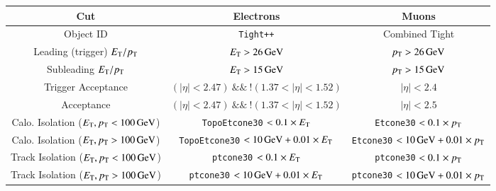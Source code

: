 \begin{table}[h]
	\centering
	\scriptsize
	\begin{tabular}{ccc}
		Cut & Electrons & Muons \\
		\hline
		Object ID & \texttt{Tight++} & Combined Tight \\
		Leading (trigger) $E_{\text{T}}/p_{\text{T}}$ & $E_{\text{T}}>\SI{26}{\giga\electronvolt} $ & $p_{\text{T}}>\SI{26}{\giga\electronvolt} $ \\
		Subleading $E_{\text{T}}/p_{\text{T}}$ & $E_{\text{T}}>\SI{15}{\giga\electronvolt} $ & $p_{\text{T}}>\SI{15}{\giga\electronvolt} $ \\
		Trigger Acceptance & $(|\eta|<2.47)\ \&\&\ !(1.37<|\eta|<1.52)$ & $|\eta|<2.4$ \\
		Acceptance & $(|\eta|<2.47)\ \&\&\ !(1.37<|\eta|<1.52)$ & $|\eta|<2.5$ \\
		Calo. Isolation ($E_{\text{T}},p_{\text{T}}<\SI{100}{\giga\electronvolt}$) & \verb.TopoEtcone30. $<0.1\times E_{\text{T}}$  & \verb.Etcone30. $<0.1\times p_{\text{T}}$ \\
		Calo. Isolation ($E_{\text{T}},p_{\text{T}}>\SI{100}{\giga\electronvolt}$) & \verb.TopoEtcone30. $<\SI{10}{\giga\electronvolt} +0.01\times E_{\text{T}}$ & \verb.Etcone30. $<\SI{10}{\giga\electronvolt} +0.01\times p_{\text{T}} $ \\
		Track Isolation ($E_{\text{T}},p_{\text{T}}<\SI{100}{\giga\electronvolt}$) & \verb.ptcone30. $< 0.1\times E_{\text{T}} $ & \verb.ptcone30. $<0.1\times p_{\text{T}}$ \\
		Track Isolation ($E_{\text{T}},p_{\text{T}}>\SI{100}{\giga\electronvolt}$) & \verb.ptcone30. $<\SI{10}{\giga\electronvolt} +0.01\times E_{\text{T}}$ & \verb.ptcone30. $<\SI{10}{\giga\electronvolt} +0.01\times p_{\text{T}} $ \\

\end{tabular}
\end{table}
